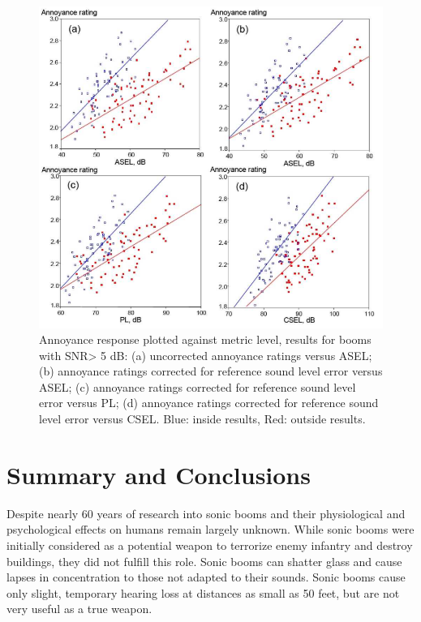 \documentclass[]{aiaa-tc}%
\begin{document}
\begin{figure}[tb!]
  \centering
  \includegraphics[width=\textwidth]{figs/indoor-outdoor-comparison.png}
  \caption{Annoyance response plotted against metric level, results for booms with SNR> 5 dB: (a) uncorrected annoyance ratings versus ASEL; (b) annoyance ratings corrected for reference sound level error versus ASEL; (c) annoyance ratings corrected for reference sound level error versus PL; (d) annoyance ratings corrected for reference sound level error versus CSEL. Blue: inside results, Red: outside results.
 ~\cite{sullivan2010human}}
  \label{fig:indoor-outdoor-comparison}
\end{figure}

\section{Summary and Conclusions}
Despite nearly 60 years of research into sonic booms and their physiological and psychological effects on humans remain largely unknown. While sonic booms were initially considered as a potential weapon to terrorize enemy infantry and destroy buildings, they did not fulfill this role. Sonic booms can shatter glass and cause lapses in concentration to those not adapted to their sounds. Sonic booms cause only slight, temporary hearing loss at distances as small as 50 feet, but are not very useful as a true weapon.
\end{document}
